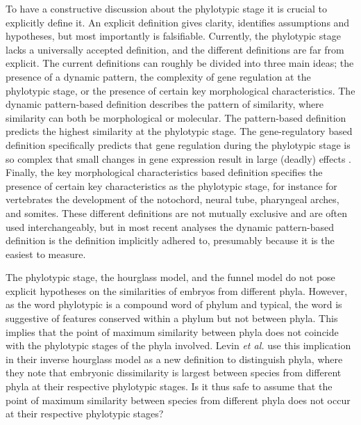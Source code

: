 To have a constructive discussion about the phylotypic stage it is crucial to explicitly define it. An explicit definition gives clarity, identifies assumptions and hypotheses, but most importantly is falsifiable. Currently, the phylotypic stage lacks a universally accepted definition, and the different definitions are far from explicit. The current definitions can roughly be divided into three main ideas; the presence of a dynamic pattern, the complexity of gene regulation at the phylotypic stage, or the presence of certain key morphological characteristics\cite{OlafRP2003}. The dynamic pattern-based definition describes the pattern of similarity, where similarity can both be morphological or molecular\cite{Slack1993,Duboule1994}. The pattern-based definition predicts the highest similarity at the phylotypic stage. The gene-regulatory based definition specifically predicts that gene regulation during the phylotypic stage is so complex that small changes in gene expression result in large (deadly) effects \cite{raff1996}. Finally, the key morphological characteristics based definition specifies the presence of certain key characteristics as the phylotypic stage, for instance for vertebrates the development of the notochord, neural tube, pharyngeal arches, and somites\cite{Kimmel1995}. These different definitions are not mutually exclusive and are often used interchangeably, but in most recent analyses the dynamic pattern-based definition is the definition implicitly adhered to, presumably because it is the easiest to measure.

The phylotypic stage, the hourglass model, and the funnel model do not pose explicit hypotheses on the similarities of embryos from different phyla. However, as the word phylotypic is a compound word of phylum and typical, the word is suggestive of features conserved within a phylum but not between phyla. This implies that the point of maximum similarity between phyla does not coincide with the phylotypic stages of the phyla involved. Levin \textit{et al.}\cite{Levin2016} use this implication in their inverse hourglass model as a new definition to distinguish phyla, where they note that embryonic dissimilarity is largest between species from different phyla at their respective phylotypic stages. Is it thus safe to assume that the point of maximum similarity between species from different phyla does not occur at their respective phylotypic stages? 

